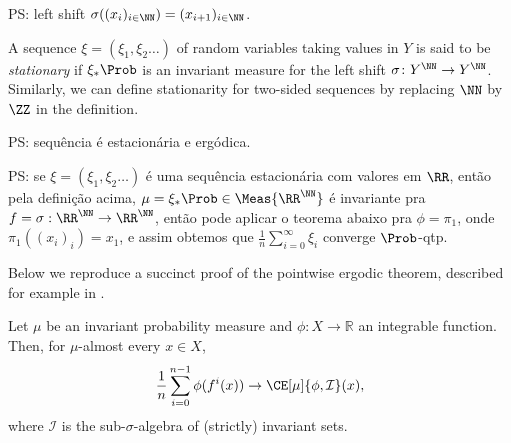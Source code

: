 \documentclass[../main.tex]{subfiles}
\begin{document}
PS: left shift \(\sigma((x_i)_{i \in \NN}) = (x_{i + 1})_{i \in \NN}\).

\begin{definition}
  A sequence \(\xi = (\xi_1,\xi_2\dots)\) of random variables taking values in \(Y\) is said to be \emph{stationary} if \(\xi_*\Prob\) is an invariant measure for the left shift \(\sigma \colon Y^{\NN} \to Y^{\NN}\). Similarly, we can define stationarity for two-sided sequences by replacing \(\NN\) by \(\ZZ\) in the definition.
\end{definition}
PS: sequência \iid é estacionária e ergódica.

PS: se \(\xi = (\xi_1,\xi_2\dots)\) é uma sequência estacionária com valores em \(\RR\), então pela definição acima, \(\mu = \xi_*\Prob \in \Meas{\RR^{\NN}}\) é invariante pra \(f = \sigma : \RR^{\NN} \to \RR^{\NN}\), então pode aplicar o teorema abaixo pra \(\phi = \pi_1\), onde \(\pi_1((x_i)_i) = x_1\), e assim obtemos que \(\frac{1}{n}\sum_{i = 0}^{\infty} \xi_i\) converge \(\Prob\)-qtp.  

Below we reproduce a succinct proof of the pointwise ergodic theorem, described for example in \cites[32]{przytyckiConformalFractalsErgodic2010}[136]{katokIntroductionModernTheory1995}.

\begin{theorem}\label{thm:birkhoff}
  Let  \(\mu\) be an invariant probability measure and \(\phi \colon X \to \mathbb{R}\) an integrable function. Then, for \(\mu\)-almost every \(x \in X\),
  \begin{equation*}
    \frac{1}{n}\sum_{i = 0}^{n - 1} \phi (f^i(x)) \to \CE[\mu]{\phi, \mathcal{I}}(x),
  \end{equation*}
  where \(\mathcal{I}\) is the sub-\(\sigma\)-algebra of (strictly) invariant sets.
\end{theorem}
\end{document}
